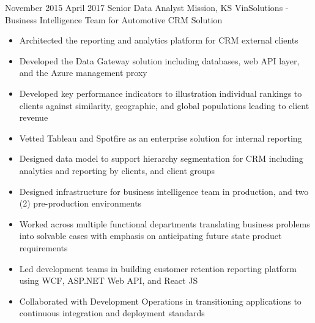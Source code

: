 \vspace*{0.05 in}

\ProjectExperience
{November 2015}
{April 2017}
{Senior Data Analyst}
{Mission, KS}
{VinSolutions - Business Intelligence Team for Automotive CRM Solution}
{
    \begin{itemize}
        \item Architected the reporting and analytics platform for CRM external
        clients
        \item Developed the Data Gateway solution including databases, web API
        layer, and the Azure management proxy
        \item Developed key performance indicators to illustration individual
        rankings to clients against similarity, geographic, and global
        populations leading to client revenue
    \end{itemize}
}
{
    \begin{itemize}
        \item Vetted Tableau and Spotfire as an enterprise solution for internal
        reporting
        \item Designed data model to support hierarchy segmentation for CRM
        including analytics and reporting by clients, and client groups
        \item Designed infrastructure for business intelligence team in
        production, and two (2) pre-production environments
    \end{itemize}
}
{
    \begin{itemize}
        \item Worked across multiple functional departments translating business
        problems into solvable cases with emphasis on anticipating future state
        product requirements
        \item Led development teams in building customer retention reporting
        platform using WCF, ASP.NET Web API, and React JS
        \item Collaborated with Development Operations in transitioning
        applications to continuous integration and deployment standards
    \end{itemize}
}

\vspace*{0.05 in}

